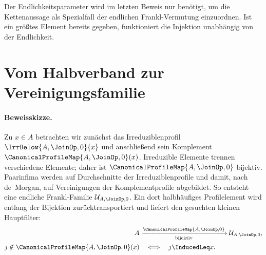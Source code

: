 \documentclass[main.tex]{subfiles}
\begin{document}
\begin{tabproofsplitwide}
  \closeproofpartwide
\end{tabproofsplitwide}

Der Endlichkeitsparameter wird im letzten Beweis nur benötigt, um die
Kettenaussage als Spezialfall der endlichen Frankl-Vermutung einzuordnen. Ist
ein größtes Element bereits gegeben, funktioniert die Injektion unabhängig
von der Endlichkeit.


\section{Vom Halbverband zur Vereinigungsfamilie}

\paragraph{Beweisskizze.}
Zu \(x\in A\) betrachten wir zunächst das Irreduziblenprofil
\(\IrrBelow{A,\JoinOp,0}{x}\) und anschließend sein Komplement
\(\CanonicalProfileMap{A,\JoinOp,0}(x)\). Irreduzible Elemente trennen
verschiedene Elemente; daher ist \(\CanonicalProfileMap{A,\JoinOp,0}\)
bijektiv. Paarinfima werden auf Durchschnitte der
Irreduziblenprofile und damit, nach de~Morgan, auf Vereinigungen der
Komplementprofile abgebildet. So entsteht eine endliche Frankl-Familie
\(\mathcal U_{A,\JoinOp,0}\). Ein dort halbhäufiges Profilelement wird entlang
der Bijektion zurücktransportiert und liefert den gesuchten kleinen
Hauptfilter:
\[
  \begin{aligned}
    A&\xrightarrow[\text{bijektiv}]{\CanonicalProfileMap{A,\JoinOp,0}}
      \mathcal U_{A,\JoinOp,0},\\
    j\notin\CanonicalProfileMap{A,\JoinOp,0}(x)
      &\quad\Longleftrightarrow\quad j\InducedLeq x.
  \end{aligned}
\]

\end{document}
